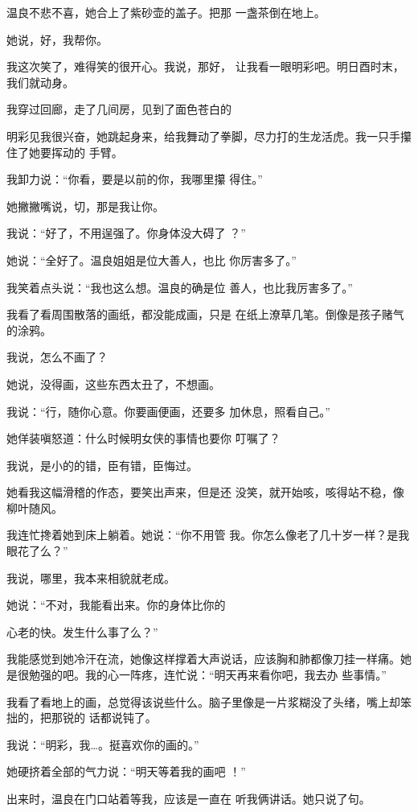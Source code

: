 \documentclass{article}
\begin{document}
温良不悲不喜，她合上了紫砂壶的盖子。把那
一盏茶倒在地上。 


她说，好，我帮你。 

我这次笑了，难得笑的很开心。我说，那好，
让我看一眼明彩吧。明日酉时末，我们就动身。 

我穿过回廊，走了几间房，见到了面色苍白的

\newpage

明彩见我很兴奋，她跳起身来，给我舞动了拳脚，尽力打的生龙活虎。我一只手攥住了她要挥动的
手臂。 

我卸力说：“你看，要是以前的你，我哪里攥
得住。” 


她撇撇嘴说，切，那是我让你。 

我说：“好了，不用逞强了。你身体没大碍了
？” 

她说：“全好了。温良姐姐是位大善人，也比
你厉害多了。” 

我笑着点头说：“我也这么想。温良的确是位
善人，也比我厉害多了。” 

我看了看周围散落的画纸，都没能成画，只是
在纸上潦草几笔。倒像是孩子赌气的涂鸦。 

\newpage


我说，怎么不画了？ 


她说，没得画，这些东西太丑了，不想画。 

我说：“行，随你心意。你要画便画，还要多
加休息，照看自己。” 

她佯装嗔怒道：什么时候明女侠的事情也要你
叮嘱了？ 


我说，是小的的错，臣有错，臣悔过。 

她看我这幅滑稽的作态，要笑出声来，但是还
没笑，就开始咳，咳得站不稳，像柳叶随风。 

我连忙搀着她到床上躺着。她说：“你不用管
我。你怎么像老了几十岁一样？是我眼花了么？” 


我说，哪里，我本来相貌就老成。 

她说：“不对，我能看出来。你的身体比你的
\newpage

心老的快。发生什么事了么？” 

我能感觉到她冷汗在流，她像这样撑着大声说话，应该胸和肺都像刀挂一样痛。她是很勉强的吧。我的心一阵疼，连忙说：“明天再来看你吧，我去办
些事情。” 

我看了看地上的画，总觉得该说些什么。脑子里像是一片浆糊没了头绪，嘴上却笨拙的，把那锐的
话都说钝了。 


我说：“明彩，我…。挺喜欢你的画的。” 

她硬挤着全部的气力说：“明天等着我的画吧
！” 

出来时，温良在门口站着等我，应该是一直在
听我俩讲话。她只说了句。 
\end{document}
